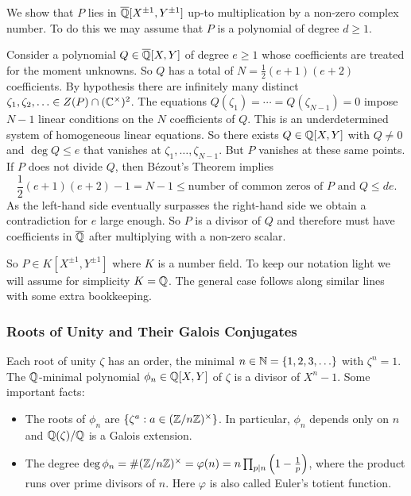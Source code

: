 We show that $P$ lies in ${\overline{\mathbb{Q}}}[X^{\pm 1},Y^{\pm 1}]$ up-to
multiplication by a non-zero complex number. To do this we may assume
that $P$ is a polynomial of degree $d\ge 1$.

Consider a polynomial $Q\in
{\overline{\mathbb{Q}}}[X,Y]$ of degree $e\ge 1$ whose coefficients are treated for the
moment unknowns. So
$Q$ has a total of $N = \frac 12 (e+1)(e+2)$ coefficients. 
By hypothesis there are infinitely many distinct
$\zeta_1,\zeta_2,\ldots \in Z(P)\cap ({\mathbb{C}}^\times)^2$.
The equations $Q(\zeta_1) = \cdots = Q(\zeta_{N-1})=0$
impose $N-1$ linear conditions on the $N$ coefficients of
$Q$.
This is an underdetermined system of homogeneous linear equations. So
there exists $Q\in {\mathbb{Q}}[X,Y]$ with $Q\not=0$  and $\deg Q \le e$ that vanishes at
$\zeta_1,\ldots,\zeta_{N-1}$. But $P$ vanishes at these same points.
If $P$ does not divide $Q$, then B\'ezout's Theorem implies
\begin{equation*}
  \frac 12 (e+1)(e+2)-1=  N-1 \le \text{number of common zeros of $P$ and $Q$} \le de.
\end{equation*}
As the left-hand side eventually surpasses  the right-hand side we obtain a
contradiction for $e$ large enough. So $P$ is a divisor of $Q$ and
therefore must have coefficients in ${\overline{\mathbb{Q}}}$ after multiplying with a non-zero
scalar. 

So $P \in K[X^{\pm 1},Y^{\pm 1}]$ where $K$ is a number field. To keep
our notation light we will assume for simplicity
$K={\mathbb{Q}}$. The general case follows along similar lines with some extra
bookkeeping.

\subsubsection{Roots of Unity and Their Galois Conjugates}
\label{sec:rootsof1}
Each root of unity $\zeta$ has an order, the minimal
$n\in{\mathbb{N}}=\{1,2,3,\ldots\}$
with
$\zeta^n=1$. The ${\mathbb{Q}}$-minimal polynomial $\phi_n\in{\mathbb{Q}}[X,Y]$
of $\zeta$ is a divisor of
$X^n-1$. Some important facts:

\begin{itemize}
\item The roots of $\phi_n$ are $\{\zeta^a : a\in
  ({\mathbb{Z}}/n{\mathbb{Z}})^\times\}$. In particular, $\phi_n$ depends only on $n$
  and ${\mathbb{Q}}(\zeta)/{\mathbb{Q}}$ is a Galois extension. 
\item The degree $\deg \phi_n = \#({\mathbb{Z}}/n{\mathbb{Z}})^\times = \varphi(n)= n \prod_{p\mid n}
  \left(1-\frac 1p\right)$, where the product runs over prime divisors
  of $n$. Here $\varphi$ is also called Euler's totient function.
\end{itemize}

